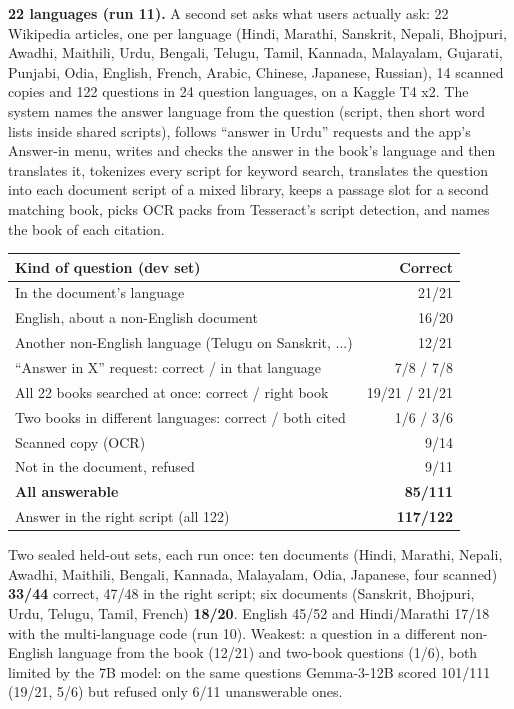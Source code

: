 \documentclass[10pt,a4paper]{article}
\newcommand{\note}[1]{{\raggedright\color{muted}\fontsize{8.3}{10}\selectfont #1\par}}
\begin{document}
\vspace{4pt}
\textbf{22 languages (run 11).} A second set asks what users actually ask: 22 Wikipedia articles, one per language
(Hindi, Marathi, Sanskrit, Nepali, Bhojpuri, Awadhi, Maithili, Urdu, Bengali, Telugu, Tamil, Kannada, Malayalam, Gujarati, Punjabi,
Odia, English, French, Arabic, Chinese, Japanese, Russian), 14 scanned copies and 122 questions in 24 question languages, on a Kaggle
T4 x2. The system names the answer language from the question (script, then short word lists inside shared scripts), follows
``answer in Urdu'' requests and the app's Answer-in menu, writes and checks the answer in the book's language and then translates it,
tokenizes every script for keyword search, translates the question into each document script of a mixed library, keeps a passage
slot for a second matching book, picks OCR packs from Tesseract's script detection, and names the book of each citation.

\begin{minipage}[t]{0.56\textwidth}
\renewcommand{\arraystretch}{1.15}
{\fontsize{8.2}{10}\selectfont
\begin{tabularx}{\linewidth}{@{}X r@{}}
\toprule
Kind of question (dev set) & \textbf{Correct} \\ \midrule
In the document's language & 21/21 \\
English, about a non-English document & 16/20 \\
Another non-English language (Telugu on Sanskrit, ...) & 12/21 \\
``Answer in X'' request: correct / in that language & 7/8 / 7/8 \\
All 22 books searched at once: correct / right book & 19/21 / 21/21 \\
Two books in different languages: correct / both cited & 1/6 / 3/6 \\
Scanned copy (OCR) & 9/14 \\
Not in the document, refused & 9/11 \\ \midrule
\textbf{All answerable} & \textbf{85/111} \\
Answer in the right script (all 122) & \textbf{117/122} \\
\bottomrule
\end{tabularx}}
\end{minipage}\hfill
\begin{minipage}[t]{0.41\textwidth}
\vspace{0pt}
\note{Two sealed held-out sets, each run once: ten documents (Hindi, Marathi, Nepali, Awadhi, Maithili, Bengali, Kannada, Malayalam,
Odia, Japanese, four scanned) \textbf{33/44} correct, 47/48 in the right script; six documents (Sanskrit, Bhojpuri, Urdu, Telugu,
Tamil, French) \textbf{18/20}. English 45/52 and Hindi/Marathi 17/18 with the multi-language code (run 10). Weakest: a question in a
different non-English language from the book (12/21) and two-book questions (1/6), both limited by the 7B model: on the same
questions Gemma-3-12B scored 101/111 (19/21, 5/6) but refused only 6/11 unanswerable ones.}
\end{minipage}
\end{document}
